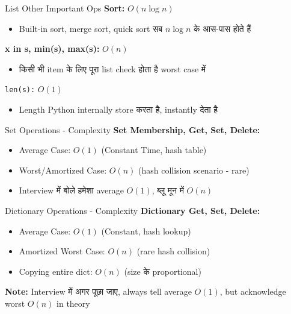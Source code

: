 \documentclass[aspectratio=169]{beamer}
\begin{document}
\begin{frame}{List Other Important Ops}
\textcolor{GoogleGreen}{\textbf{Sort:}} $O(n\log n)$
\begin{itemize}
    \item Built-in sort, merge sort, quick sort सब $n\log n$ के आस-पास होते हैं
\end{itemize}
\textcolor{GoogleYellow}{\textbf{x in s, min(s), max(s):}} $O(n)$
\begin{itemize}
    \item किसी भी item के लिए पूरा list check होता है worst case में
\end{itemize}
\texttt{len(s):} $O(1)$
\begin{itemize}
    \item Length Python internally store करता है, instantly देता है
\end{itemize}
\end{frame}

\begin{frame}{Set Operations - Complexity}
\textbf{Set Membership, Get, Set, Delete:}
\begin{itemize}
    \item Average Case: $O(1)$ (Constant Time, hash table)
    \item Worst/Amortized Case: $O(n)$ (hash collision scenario - rare)
    \item Interview में बोले हमेशा average $O(1)$, ब्लू मून में $O(n)$
\end{itemize}
\end{frame}

\begin{frame}{Dictionary Operations - Complexity}
\textbf{Dictionary Get, Set, Delete:}
\begin{itemize}
    \item Average Case: $O(1)$ (Constant, hash lookup)
    \item Amortized Worst Case: $O(n)$ (rare hash collision)
    \item Copying entire dict: $O(n)$ (size के proportional)
\end{itemize}
\textbf{Note:} Interview में अगर पूछा जाए, always tell average $O(1)$, but acknowledge worst $O(n)$ in theory
\end{frame}
\end{document}
